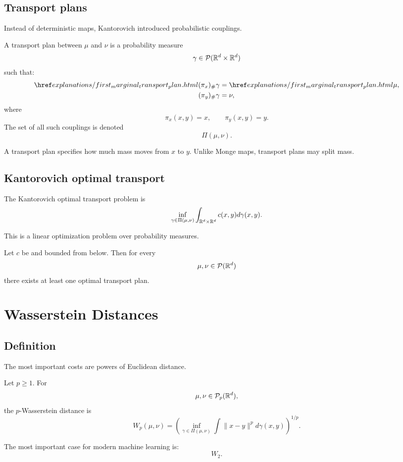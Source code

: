 \subsection{Transport plans}
Instead of deterministic maps, Kantorovich introduced probabilistic couplings.
\begin{definition}
A transport plan between $\mu$ and $\nu$ is a probability measure
\[
\gamma \in \mathcal{P}(\mathbb{R}^d\times\mathbb{R}^d)
\]
such that:
\begin{align*}
\explanationlink{first_marginal_transport_plan}{(\pi_x)_{\#}\gamma} &= \explanationlink{first_marginal_transport_plan}{\mu},
\\
(\pi_y)_{\#}\gamma &= \nu,
\end{align*}
where
\[
\pi_x(x,y)=x,
\qquad
\pi_y(x,y)=y.
\]
The set of all such couplings is denoted
\[
\Pi(\mu,\nu).
\]
\end{definition}
\begin{remark}
A transport plan specifies how much mass moves from $x$ to $y$.
Unlike Monge maps, transport plans may split mass.
\end{remark}
\subsection{Kantorovich optimal transport}
\begin{definition}
The Kantorovich optimal transport problem is
\[
\inf_{\gamma \in \Pi(\mu,\nu)}
\int_{\mathbb{R}^d\times\mathbb{R}^d}
 c(x,y)d\gamma(x,y).
\]
\end{definition}
This is a linear optimization problem over probability measures.
\begin{theorem}
Let $c$ be  and bounded from below. Then for every
\[
\mu,\nu \in \mathcal{P}(\mathbb{R}^d)
\]
there exists at least one optimal transport plan.
\end{theorem}
\section{Wasserstein Distances}
\subsection{Definition}
The most important costs are powers of Euclidean distance.
\begin{definition}
Let $p\ge1$. For
\[
\mu,\nu \in \mathcal{P}_p(\mathbb{R}^d),
\]
the $p$-Wasserstein distance is
\[
W_p(\mu,\nu)
=
\left(
\inf_{\gamma\in\Pi(\mu,\nu)}
\int \|x-y\|^p d\gamma(x,y)
\right)^{1/p}.
\]
\end{definition}
The most important case for modern machine learning is:
\[
W_2.
\]
